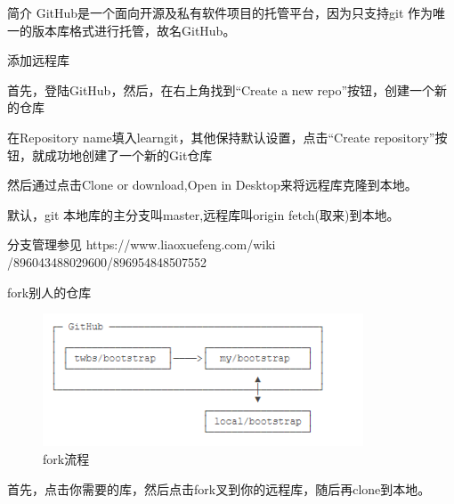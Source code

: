 \documentclass[hyperref,UTF8,10pt]{beamer}
\numberwithin{equation}{section} %
\begin{document}
\begin{frame}{简介}
GitHub是一个面向开源及私有软件项目的托管平台，因为只支持git 作为唯一的版本库格式进行托管，故名GitHub。
\end{frame}

\begin{frame}{添加远程库}

首先，登陆GitHub，然后，在右上角找到“Create a new repo”按钮，创建一个新的仓库

在Repository name填入learngit，其他保持默认设置，点击“Create repository”按钮，就成功地创建了一个新的Git仓库

然后通过点击Clone or download,Open in Desktop来将远程库克隆到本地。

默认，git 本地库的主分支叫master,远程库叫origin fetch(取来)到本地。

分支管理参见
https://www.liaoxuefeng.com/wiki\\
/896043488029600/896954848507552
\end{frame}


\begin{frame}{fork别人的仓库}
\begin{figure}
\centering
\includegraphics[width=0.85\textwidth]{clone.PNG}
\caption{fork流程}
\end{figure}

首先，点击你需要的库，然后点击fork叉到你的远程库，随后再clone到本地。
\end{frame}
\end{document}
